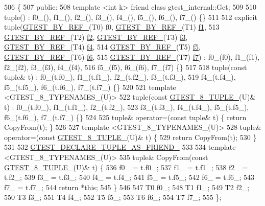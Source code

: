 \begin{DoxyCode}
506                         \{
507  \textcolor{keyword}{public}:
508   \textcolor{keyword}{template} <\textcolor{keywordtype}{int} k> \textcolor{keyword}{friend} \textcolor{keyword}{class }gtest\_internal::Get;
509 
510   tuple() : f0\_(), f1\_(), f2\_(), f3\_(), f4\_(), f5\_(), f6\_(), f7\_() \{\}
511 
512   \textcolor{keyword}{explicit} tuple(\hyperlink{gtest-tuple_8h_adcf9057737a411d833fac0382c13a181}{GTEST\_BY\_REF\_}(T0) f0, \hyperlink{gtest-tuple_8h_adcf9057737a411d833fac0382c13a181}{GTEST\_BY\_REF\_}(T1) 
      \hyperlink{namespacestd_1_1tr1_a9c0fa65b105f8e2f58ba59ecf75fd000}{f1},
513       \hyperlink{gtest-tuple_8h_adcf9057737a411d833fac0382c13a181}{GTEST\_BY\_REF\_}(T2) \hyperlink{namespacestd_1_1tr1_a87dd9e009868361317f587126dba63d4}{f2}, \hyperlink{gtest-tuple_8h_adcf9057737a411d833fac0382c13a181}{GTEST\_BY\_REF\_}(T3) \hyperlink{namespacestd_1_1tr1_a0f7c3b47d27d42d82d1a333ea420ce4e}{f3}, 
      \hyperlink{gtest-tuple_8h_adcf9057737a411d833fac0382c13a181}{GTEST\_BY\_REF\_}(T4) \hyperlink{namespacestd_1_1tr1_adc796e02b7385d526aff708189564f67}{f4},
514       \hyperlink{gtest-tuple_8h_adcf9057737a411d833fac0382c13a181}{GTEST\_BY\_REF\_}(T5) \hyperlink{namespacestd_1_1tr1_a9c1eb66b2b2fa321942af95405232a0d}{f5}, \hyperlink{gtest-tuple_8h_adcf9057737a411d833fac0382c13a181}{GTEST\_BY\_REF\_}(T6) \hyperlink{namespacestd_1_1tr1_a6b62f32e1e3e21bceb94eb46c4cbfd56}{f6},
515       \hyperlink{gtest-tuple_8h_adcf9057737a411d833fac0382c13a181}{GTEST\_BY\_REF\_}(T7) \hyperlink{namespacestd_1_1tr1_a2185f3a1c07f2df072c39cb91ffa89a4}{f7}) : f0\_(f0), f1\_(f1), f2\_(f2), f3\_(f3), f4\_(f4),
516       f5\_(f5), f6\_(f6), f7\_(f7) \{\}
517 
518   tuple(\textcolor{keyword}{const} tuple& t) : f0\_(t.f0\_), f1\_(t.f1\_), f2\_(t.f2\_), f3\_(t.f3\_),
519       f4\_(t.f4\_), f5\_(t.f5\_), f6\_(t.f6\_), f7\_(t.f7\_) \{\}
520 
521   \textcolor{keyword}{template} <GTEST\_8\_TYPENAMES\_(U)>
522   tuple(\textcolor{keyword}{const} \hyperlink{gtest-tuple_8h_a2bc36d1a71a551e6cda2ac5504fb7ce3}{GTEST\_8\_TUPLE\_}(U)& t) : f0\_(t.f0\_), f1\_(t.f1\_), f2\_(t.f2\_),
523       f3\_(t.f3\_), f4\_(t.f4\_), f5\_(t.f5\_), f6\_(t.f6\_), f7\_(t.f7\_) \{\}
524 
525   tuple& operator=(\textcolor{keyword}{const} tuple& t) \{ \textcolor{keywordflow}{return} CopyFrom(t); \}
526 
527   \textcolor{keyword}{template} <GTEST\_8\_TYPENAMES\_(U)>
528   tuple& operator=(\textcolor{keyword}{const} \hyperlink{gtest-tuple_8h_a2bc36d1a71a551e6cda2ac5504fb7ce3}{GTEST\_8\_TUPLE\_}(U)& t) \{
529     \textcolor{keywordflow}{return} CopyFrom(t);
530   \}
531 
532   \hyperlink{gtest-tuple_8h_a2b20671273f514a88a6e9b8328e5f257}{GTEST\_DECLARE\_TUPLE\_AS\_FRIEND\_}
533 
534   \textcolor{keyword}{template} <GTEST\_8\_TYPENAMES\_(U)>
535   tuple& CopyFrom(\textcolor{keyword}{const} \hyperlink{gtest-tuple_8h_a2bc36d1a71a551e6cda2ac5504fb7ce3}{GTEST\_8\_TUPLE\_}(U)& t) \{
536     f0\_ = t.f0\_;
537     f1\_ = t.f1\_;
538     f2\_ = t.f2\_;
539     f3\_ = t.f3\_;
540     f4\_ = t.f4\_;
541     f5\_ = t.f5\_;
542     f6\_ = t.f6\_;
543     f7\_ = t.f7\_;
544     \textcolor{keywordflow}{return} *\textcolor{keyword}{this};
545   \}
546 
547   T0 f0\_;
548   T1 f1\_;
549   T2 f2\_;
550   T3 f3\_;
551   T4 f4\_;
552   T5 f5\_;
553   T6 f6\_;
554   T7 f7\_;
555 \};
\end{DoxyCode}
